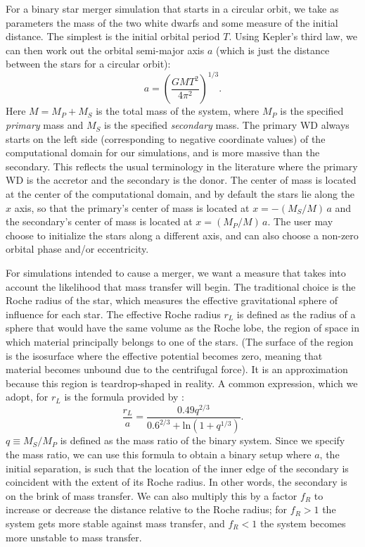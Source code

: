 \documentclass[12pt]{article}
\begin{document}
For a binary star merger simulation that starts in a circular orbit,
we take as parameters the mass of the two white dwarfs and some measure
of the initial distance. The simplest is the initial orbital period $T$.
Using Kepler's third law, we can then work
out the orbital semi-major axis $a$ (which is just the distance between the
stars for a circular orbit):
\begin{equation}
  a = \left(\frac{GM T^2}{4\pi^2}\right)^{1/3}.
\end{equation}
Here $M = M_P + M_S$ is the total mass of the system, where $M_P$ is
the specified \textit{primary} mass and $M_S$ is the specified
\textit{secondary} mass. The primary WD always starts on the left
side (corresponding to negative coordinate values) of the computational domain for our simulations, and is more
massive than the secondary. This reflects the usual terminology in the
literature where the primary WD is the accretor and the secondary is
the donor. The center of mass is located at the center of the
computational domain, and by default the stars lie along the $x$ axis, so that
the primary's center of mass is located at $x = -(M_S / M)\, a$ and
the secondary's center of mass is located at $x = (M_P / M)\, a$.
The user may choose to initialize the stars along a different axis,
and can also choose a non-zero orbital phase and/or eccentricity.

For simulations intended to cause a merger, we want a measure that takes
into account the likelihood that mass transfer will begin. The traditional
choice is the Roche radius of the star, which measures the effective gravitational
sphere of influence for each star. The effective Roche radius $r_L$ is defined as
the radius of a sphere that would have the same volume as the Roche lobe, the
region of space in which material principally belongs to one of the stars. (The surface
of the region is the isosurface where the effective potential becomes zero, meaning
that material becomes unbound due to the centrifugal force). It is
an approximation because this region is teardrop-shaped in reality. A common
expression, which we adopt, for $r_L$ is
the formula provided by \citet{eggleton:1983}:
\begin{equation}
  \frac{r_L}{a} = \frac{0.49 q^{2/3}}{0.6^{2/3} + \text{ln}(1 + q^{1/3})}.\label{eq:roche_radius}
\end{equation}
$q \equiv M_S / M_P$ is defined as the mass ratio of the binary system. Since
we specify the mass ratio, we can use this formula to obtain a binary setup where $a$,
the initial separation, is such that the location of the inner edge of the secondary
is coincident with the extent of its Roche radius.
In other words, the secondary is on the brink of mass transfer. We can also multiply this
by a factor $f_R$ to increase or decrease the distance relative to the Roche radius; for
$f_R > 1$ the system gets more stable against mass transfer, and $f_R < 1$ the system becomes
more unstable to mass transfer.
\end{document}
